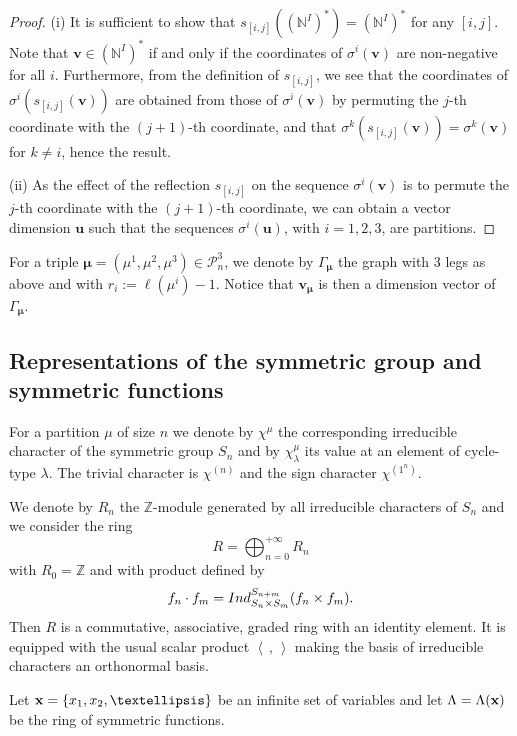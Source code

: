 \documentclass[11pt]{article}
\theoremstyle{definition}
\numberwithin{equation}{section}
\newcommand{\calP}{\mathcal{P}}
\newcommand{\bv}{{\mathbf{v}}}
\newcommand{\bu}{\mathbf{u}}
\newcommand{\Z}{{\mathbb{Z}}}
\newcommand{\N}{{\mathbb{N}}}
\newcommand{\muhat}{{\boldsymbol \mu}}
\newcommand{\x}{{\bf x}}
\begin{document}
\begin{proof}
	\noindent(i) It is sufficient to show that $s_{[i,j]}((\N^I)^*)=(\N^I)^*$ for any $[i,j]$. Note that $\bv\in (\N^I)^*$ if and only if the coordinates of $ \sigma^i(\bv)$ are non-negative for all $i$. 
	Furthermore, from the definition of $s_{[i,j]}$, we see that the coordinates of $\sigma^i(s_{[i,j]}(\bv))$  are obtained from those of $\sigma^i(\bv)$ by permuting the $j$-th coordinate with the $(j+1)$-th coordinate, and that $\sigma^k(s_{[i,j]}(\bv))=\sigma^k(\bv)$ for $k\neq i$, hence the result.
	
	\noindent(ii) As the effect of the reflection $s_{[i,j]}$ on the sequence $\sigma^i(\bv)$ is to permute the $j$-th coordinate with the $(j+1)$-th coordinate, we can obtain a vector dimension $\bu$ such that the sequences $\sigma^i(\bu)$, with $i=1,2,3$, are partitions.    
\end{proof}

For a triple  $\muhat=(\mu^1,\mu^2,\mu^3)\in\calP_n^3$, we denote by $\Gamma_\muhat$ the graph with $3$ legs as above and with $r_i:=\ell(\mu^i)-1$. Notice that $\bv_\muhat$ is then a dimension vector of $\Gamma_\muhat$. 




\subsection{Representations of the symmetric group and symmetric functions}\label{symmetric-section}




For a partition $\mu$ of size $n$ we denote by $\chi^\mu$ the corresponding irreducible character of the symmetric group $S_n$ and by $\chi^\mu_\lambda$ its value at an element of cycle-type $\lambda$. The trivial character is $\chi^{(n)}$ and the sign character $\chi^{(1^n)}$. 


We denote by $R_n$ the $\Z$-module generated by all irreducible characters of $S_n$  and we consider  the ring
$$
R=\bigoplus_{n=0}^{+\infty}R_n
$$
with $R_0=\Z$ and with product defined by 
$$
f_n\cdot f_m={\rm Ind}_{S_n\times S_m}^{S_{n+m}}(f_n\times f_m).
$$
Then $R$ is  a commutative, associative, graded ring with an identity element. It is equipped with the usual scalar product $\left\langle\,,\,\right\rangle$ making the basis of irreducible characters an orthonormal basis.


Let $\x=\{x_1,x_2,\dots\}$ be an infinite set of variables and let $\Lambda=\Lambda(\x)$ be the ring of symmetric functions. 
\end{document}
